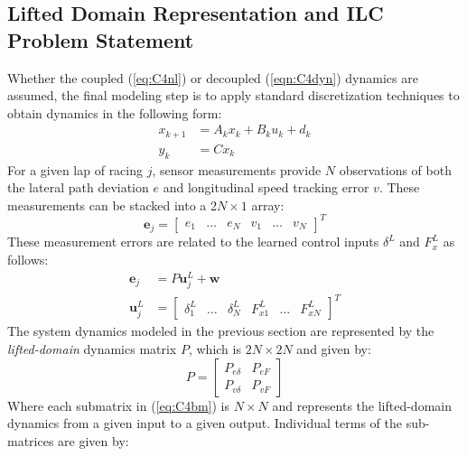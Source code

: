 \documentclass[9pt,shortpaper,twoside,web]{ieeecolor}
\begin{document}
{{{\subsection{Lifted Domain Representation and ILC \newline Problem Statement}
\label{sec:liftedD}
Whether the coupled (\ref{eq:C4nl}) or decoupled (\ref{eqn:C4dyn}) dynamics are assumed, the
final modeling step is to apply standard discretization techniques to obtain dynamics in the following form:
\begin{align}
\label{C4ad}
x_{k+1} &= A_kx_k + B_ku_k + d_k \\
y_{k}   &= Cx_k
\end{align}
For a given lap of racing $j$, sensor measurements provide $N$ observations of both the lateral path deviation $e$ and longitudinal
speed tracking error $v$. These measurements can be stacked into a 2$N \times 1$ array: 
\begin{equation}
\mathbf{e}_j = \begin{bmatrix} e_1 & \hdots & e_N & v_1 & \hdots & v_N \end{bmatrix}^T
\end{equation} 
These measurement errors are related to the learned control inputs $\delta^L$ and $F^L_x$ as follows: 
\begin{align}
\label{eq:liftedDomain}
\mathbf{e}_j &= P\mathbf{u}^L_j + \mathbf{w} \\
\mathbf{u}^L_j &= \begin{bmatrix} \delta^L_1 & \hdots & \delta^L_N & F^L_{x1} & \hdots & F^L_{xN} \end{bmatrix}^T
\end{align}
The system dynamics modeled in the previous section are represented by the \textit{lifted-domain} dynamics matrix $P$,
which is $\mathrm{2}N \times \mathrm{2}N$ and given by:
\begin{equation}
\label{eq:C4bm}
P=\left[
\begin{array}{c|c}
P_{e\delta} & P_{eF} \\ \hline
P_{v\delta} & P_{vF} 
\end{array}\right]
\end{equation}
Where each submatrix in (\ref{eq:C4bm}) is $N \times N$ and represents the lifted-domain dynamics from a given input to a given output. 
Individual terms of the sub-matrices are given by:

}}}
\end{document}
